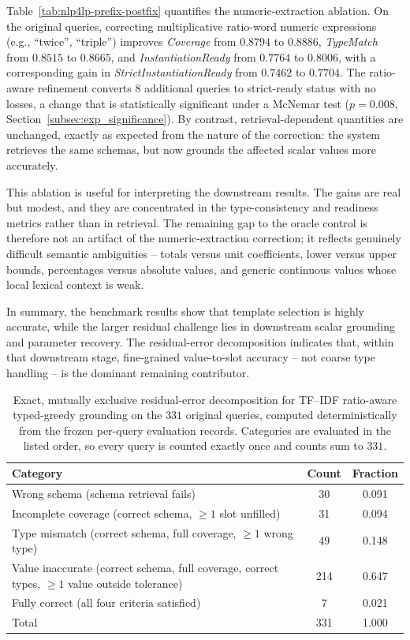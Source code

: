 \documentclass[3p]{elsarticle}
\begin{document}
Table~\ref{tab:nlp4lp-prefix-postfix} quantifies the numeric-extraction ablation. On the original queries, correcting multiplicative ratio-word numeric expressions (e.g., ``twice'', ``triple'') improves \textit{Coverage} from $0.8794$ to $0.8886$, \textit{TypeMatch} from $0.8515$ to $0.8665$, and \textit{InstantiationReady} from $0.7764$ to $0.8006$, with a corresponding gain in \textit{StrictInstantiationReady} from $0.7462$ to $0.7704$. The ratio-aware refinement converts 8 additional queries to strict-ready status with no losses, a change that is statistically significant under a McNemar test ($p=0.008$, Section~\ref{subsec:exp_significance}). By contrast, retrieval-dependent quantities are unchanged, exactly as expected from the nature of the correction: the system retrieves the same schemas, but now grounds the affected scalar values more accurately.

This ablation is useful for interpreting the downstream results. The gains are real but modest, and they are concentrated in the type-consistency and readiness metrics rather than in retrieval. The remaining gap to the oracle control is therefore not an artifact of the numeric-extraction correction; it reflects genuinely difficult semantic ambiguities -- totals versus unit coefficients, lower versus upper bounds, percentages versus absolute values, and generic continuous values whose local lexical context is weak.

In summary, the benchmark results show that template selection is highly accurate, while the larger residual challenge lies in downstream scalar grounding and parameter recovery. The residual-error decomposition indicates that, within that downstream stage, fine-grained value-to-slot accuracy -- not coarse type handling -- is the dominant remaining contributor.

\begin{table}[t]
  \centering
  \caption{Exact, mutually exclusive residual-error decomposition for TF--IDF ratio-aware typed-greedy grounding on the $331$ original queries, computed deterministically from the frozen per-query evaluation records. Categories are evaluated in the listed order, so every query is counted exactly once and counts sum to $331$.}
  \label{tab:nlp4lp-error-taxonomy}
  \small
  \setlength{\tabcolsep}{4pt}
  \begin{tabular}{p{7.4cm}cc}
    \toprule
    Category & Count & Fraction \\
    \midrule
    Wrong schema (schema retrieval fails) & 30 & 0.091 \\
    Incomplete coverage (correct schema, $\geq 1$ slot unfilled) & 31 & 0.094 \\
    Type mismatch (correct schema, full coverage, $\geq 1$ wrong type) & 49 & 0.148 \\
    Value inaccurate (correct schema, full coverage, correct types, $\geq 1$ value outside tolerance) & 214 & 0.647 \\
    Fully correct (all four criteria satisfied) & 7 & 0.021 \\
    \midrule
    Total & 331 & 1.000 \\
    \bottomrule
  \end{tabular}
\end{table}
\end{document}
